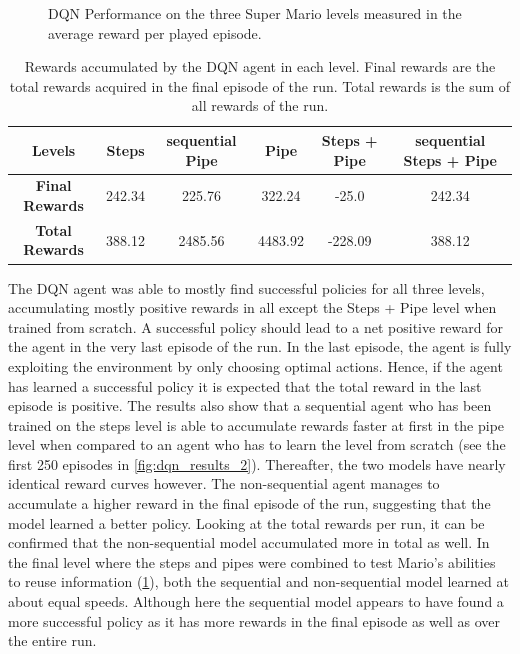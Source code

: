 \documentclass[notitlepage,a4paper,11pt]{article}
\begin{document}
\begin{figure}[t]
\begin{subfigure}[t]{0.32\textwidth}
         \caption{}
         \label{fig:dqn_results_3}
     \end{subfigure}
        \caption{DQN Performance on the three Super Mario levels measured in the average reward per played episode.}
        \label{fig:dqn_results}
\end{figure}

\begin{table}[h!]
\centering
\begin{tabular}{ |c|c|c|c|c|c| } 
	\hline
	\textbf{Levels} & Steps & sequential Pipe & Pipe & Steps + Pipe & sequential Steps + Pipe\\
	\hline
	\textbf{Final Rewards} & 242.34 & 225.76 & 322.24 & -25.0 & 242.34 \\
	\hline
	\textbf{Total Rewards} & 388.12 & 2485.56 & 4483.92 & -228.09 & 388.12 \\
	\hline
\end{tabular}
\caption{Rewards accumulated by the DQN agent in each level. Final rewards are the total rewards acquired in the final episode of the run. Total rewards is the sum of all rewards of the run.}
\end{table}

The DQN agent was able to mostly find successful policies for all three levels, accumulating mostly positive rewards in all except the Steps + Pipe level when trained from scratch. A successful policy should lead to a net positive reward for the agent in the very last episode of the run. In the last episode, the agent is fully exploiting the environment by only choosing optimal actions. Hence, if the agent has learned a successful policy it is expected that the total reward in the last episode is positive. The results also show that a sequential agent who has been trained on the steps level is able to accumulate rewards faster at first in the pipe level when compared to an agent who has to learn the level from scratch (see the first 250 episodes in \ref{fig:dqn_results_2}). Thereafter, the two models have nearly identical reward curves however. The non-sequential agent manages to accumulate a higher reward in the final episode of the run, suggesting that the model learned a better policy. Looking at the total rewards per run, it can be confirmed that the non-sequential model accumulated more in total as well. In the final level where the steps and pipes were combined to test Mario's abilities to reuse information (\ref{fig:dqn_results_3}), both the sequential and non-sequential model learned at about equal speeds. Although here the sequential model appears to have found a more successful policy as it has more rewards in the final episode as well as over the entire run.
\end{document}
